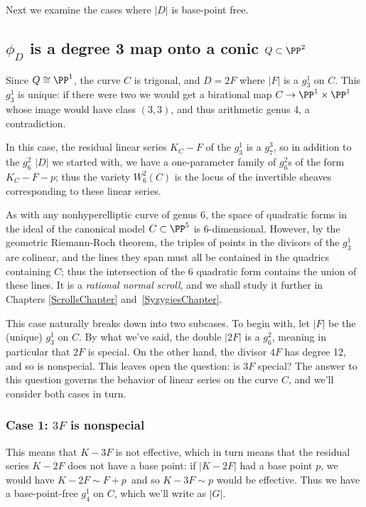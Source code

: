Next we examine the cases where $|D|$ is base-point free.

\subsection{$\phi_{D}$ is a degree 3 map onto a conic $Q \subset \PP^{2}$}

Since $Q  \cong \PP^1$, the curve $C$ is trigonal, and  $D = 2F$ where $|F|$ is a $g^{1}_{3}$ on $C$. This $g^1_3$ is unique: if there were two we would get a birational map $C \to \PP^1\times \PP^1$ whose image would have class $(3,3)$, and thus
arithmetic genus 4, a contradiction.

In this case, the residual linear series $K_C - F$ of the $g^1_3$ is a $g^3_7$, so in addition to the $g^2_6$ $|D|$ we started with, we have a one-parameter family of $g^2_6$s of the form  $K_C - F - p$; thus the variety $W^2_6(C)$ is the locus of the invertible sheaves corresponding to these linear series.

As with any nonhyperelliptic curve of genus 6, the space of quadratic forms in the ideal of the canonical model $C \subset \PP^5$ is 6-dimensional. However, by the geometric Riemann-Roch theorem, the triples of points in the divisors of the $g^1_3$ are colinear,
and the lines they span must all be contained in the quadrics containing $C$; thus the intersection of the 6 quadratic
form contains the union of these lines. It is a \emph{rational normal scroll},
and we shall study it further in Chapters \ref{ScrollsChapter} and~\ref{SyzygiesChapter}.

This case naturally breaks down into two subcases. To begin with, let $|F|$ be the (unique) $g^1_3$ on $C$. By what we've said, the double $|2F|$ is a $g^2_6$, meaning in particular that $2F$ is special. On the other hand, the divisor $4F$ has degree 12, and so is  nonspecial. This leaves open the question: is $3F$ special? The answer to this question governs the behavior of linear series on the curve $C$, and we'll consider both cases in turn.

\subsubsection{Case 1: $3F$ is nonspecial} This means that $K-3F$ is not effective, which in turn means that the residual series $K-2F$ does not have a base point: if $|K-2F|$ had a base point $p$, we would have $K - 2F \sim F + p$\, and so $K-3F \sim p$ would be effective. Thus we have a base-point-free $g^1_4$ on $C$, which we'll write as $|G|$.

